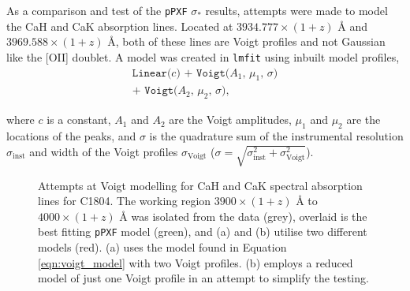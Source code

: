 \documentclass[12pt, twocolumn, nofootinbib]{revtex4-1}    %
\begin{document}
As a comparison and test of the \texttt{pPXF} $\sigma_*$ results, attempts were made to model the CaH and CaK absorption lines. Located at $3934.777\times(1+z)$ {\AA} and $3969.588\times(1+z)$ {\AA}, both of these lines are Voigt profiles and not Gaussian like the [OII] doublet. A model was created in \texttt{lmfit} using inbuilt model profiles,
\begin{multline}
    \texttt{Linear($c$) + Voigt($A_1$, $\mu_1$, $\sigma$)} \\ 
    \texttt{+ Voigt($A_2$, $\mu_2$, $\sigma$)},
    \label{eqn:voigt_model}
\end{multline} 

where $c$ is a constant, $A_1$ and $A_2$ are the Voigt amplitudes, $\mu_1$ and $\mu_2$ are the locations of the peaks, and $\sigma$ is the quadrature sum of the instrumental resolution $\sigma_{\text{inst}}$ and width of the Voigt profiles $\sigma_{\text{Voigt}}$ ($\sigma=\sqrt{\sigma_{\text{inst}}^2 + \sigma_{\text{Voigt}}^2}$). 

\begin{figure}
  \caption[Voigt modelling]{Attempts at Voigt modelling for CaH and CaK spectral absorption lines for C1804. The working region $3900\times(1+z)$ {\AA} to $4000\times(1+z)$ {\AA} was isolated from the data (grey), overlaid is the best fitting \texttt{pPXF} model (green), and (a) and (b) utilise two different models (red). (a) uses the model found in Equation \ref{eqn:voigt_model} with two Voigt profiles. (b) employs a reduced model of just one Voigt profile in an attempt to simplify the testing.}
\end{figure}
\end{document}
